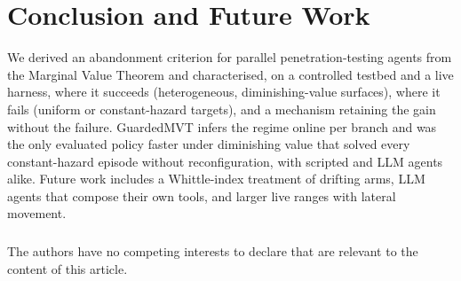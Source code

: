 \documentclass[runningheads]{llncs}
\begin{document}
\section{Conclusion and Future Work}
\label{sec:conclusion}

We derived an abandonment criterion for parallel penetration-testing agents from the Marginal Value Theorem and characterised, on a controlled testbed and
a live harness, where it succeeds (heterogeneous, diminishing-value surfaces), where it
fails (uniform or constant-hazard targets), and a mechanism retaining the gain without the
failure. GuardedMVT infers the regime online per branch and was the only evaluated policy
faster under diminishing value that solved every constant-hazard episode without
reconfiguration, with scripted and LLM agents alike. Future work includes a Whittle-index treatment of drifting arms, LLM agents
that compose their own tools, and larger live ranges with lateral movement.

\begin{credits}
\subsubsection{\discintname}
The authors have no competing interests to declare that are relevant to the content of
this article.
\end{credits}
\end{document}
